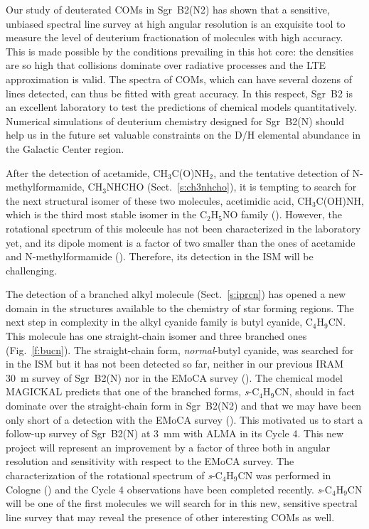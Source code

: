 \documentclass{iau}
\begin{document}
Our study of deuterated COMs in Sgr~B2(N2) has shown that a sensitive, 
unbiased spectral line survey at high angular resolution is an 
exquisite tool to measure the level of deuterium fractionation of molecules 
with high accuracy. This is made possible by the conditions prevailing in this 
hot core: the densities are so high that collisions dominate over radiative 
processes and the LTE approximation is valid. The spectra of COMs, which can 
have several dozens of lines detected, can thus be fitted with great accuracy. 
In this respect, Sgr~B2 is an excellent laboratory to test the predictions of 
chemical models quantitatively. Numerical simulations of deuterium chemistry
designed for Sgr~B2(N) should help us in the future set valuable constraints
on the D/H elemental abundance in the Galactic Center region.

After the detection of acetamide, CH$_3$C(O)NH$_2$, and the tentative detection
of N-methylformamide, CH$_3$NHCHO (Sect.~\ref{s:ch3nhcho}), it is tempting to
search for the next structural isomer of these two molecules, acetimidic acid,
CH$_3$C(OH)NH, which is the third most stable isomer in the C$_2$H$_5$NO
family (\cite{Lattelais10}). However, the rotational spectrum of this 
molecule has not been characterized in the laboratory yet, and its dipole 
moment is a factor of two smaller than the ones of acetamide and 
N-methylformamide (\cite{Lattelais09}). Therefore, its detection in the ISM 
will be challenging.

The detection of a branched alkyl molecule (Sect.~\ref{s:iprcn}) has opened a 
new domain in the structures available to the chemistry of star forming 
regions. The next step in complexity in the alkyl cyanide family is butyl
cyanide, C$_4$H$_9$CN. This molecule has one straight-chain isomer and three 
branched ones (Fig.~\ref{f:bucn}). The straight-chain form, 
\textit{normal}-butyl cyanide, was searched for in the ISM but it has not 
been detected so far, neither in our previous IRAM 30~m survey of Sgr~B2(N) 
nor in the EMoCA survey (\cite{Ordu12,Garrod17}). The chemical model MAGICKAL 
predicts that one of the branched forms, \textit{s}-C$_4$H$_9$CN, should in
fact dominate over the straight-chain form in Sgr~B2(N2) and that we may have
been only short of a detection with the EMoCA survey (\cite{Garrod17}). This
motivated us to start a follow-up survey of Sgr~B2(N) at 3~mm with ALMA in its 
Cycle 4. This new project will represent an improvement by a factor of three 
both in angular resolution and sensitivity with respect to the EMoCA survey. 
The characterization of the rotational spectrum of \textit{s}-C$_4$H$_9$CN was 
performed in Cologne (\cite{Mueller17}) and the Cycle 4 observations have been 
completed recently. \textit{s}-C$_4$H$_9$CN will be one of the first molecules
we will search for in this new, sensitive spectral line survey that may 
reveal the presence of other interesting COMs as well.
\end{document}
